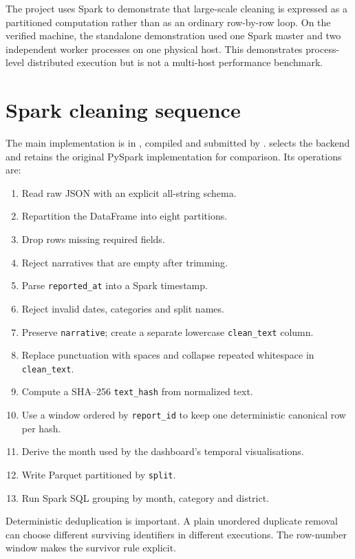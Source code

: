\documentclass[12pt,a4paper]{report}
\newcommand{\code}[1]{\texttt{#1}}
\begin{document}
The project uses Spark to demonstrate that large-scale cleaning is expressed as a partitioned computation rather than as an ordinary row-by-row loop. On the verified machine, the standalone demonstration used one Spark master and two independent worker processes on one physical host. This demonstrates process-level distributed execution but is not a multi-host performance benchmark.

\section{Spark cleaning sequence}

The main implementation is in , compiled and submitted by .  selects the backend and retains the original PySpark implementation for comparison. Its operations are:

\begin{enumerate}
  \item Read raw JSON with an explicit all-string schema.
  \item Repartition the DataFrame into eight partitions.
  \item Drop rows missing required fields.
  \item Reject narratives that are empty after trimming.
  \item Parse \code{reported\_at} into a Spark timestamp.
  \item Reject invalid dates, categories and split names.
  \item Preserve \code{narrative}; create a separate lowercase \code{clean\_text} column.
  \item Replace punctuation with spaces and collapse repeated whitespace in \code{clean\_text}.
  \item Compute a SHA--256 \code{text\_hash} from normalized text.
  \item Use a window ordered by \code{report\_id} to keep one deterministic canonical row per hash.
  \item Derive the month used by the dashboard's temporal visualisations.
  \item Write Parquet partitioned by \code{split}.
  \item Run Spark SQL grouping by month, category and district.
\end{enumerate}

Deterministic deduplication is important. A plain unordered duplicate removal can choose different surviving identifiers in different executions. The row-number window makes the survivor rule explicit.
\end{document}
